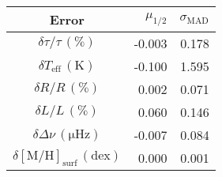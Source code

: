 \begin{tabular}{crr}
\toprule
                                                 \textbf{Error} &  $\mu_{1/2}$ &  $\sigma_\mathrm{MAD}$ \\
\midrule
                                       $\delta \tau/\tau\,(\%)$ &       -0.003 &                  0.178 \\
                          $\delta T_\mathrm{eff}\,(\mathrm{K})$ &       -0.100 &                  1.595 \\
                                             $\delta R/R\,(\%)$ &        0.002 &                  0.071 \\
                                             $\delta L/L\,(\%)$ &        0.060 &                  0.146 \\
                          $\delta \Delta\nu\,(\mathrm{\mu Hz})$ &       -0.007 &                  0.084 \\
 $\delta [\mathrm{M}/\mathrm{H}]_\mathrm{surf}\,(\mathrm{dex})$ &        0.000 &                  0.001 \\
\bottomrule
\end{tabular}
